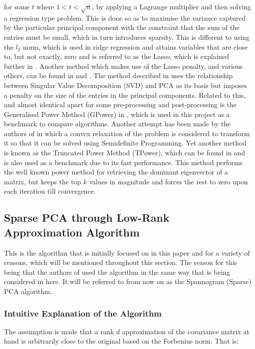 \documentclass[11pt,a4paper]{article}
\begin{document}
for some $t$ where $1<t<\sqrt{n}$, by applying a Lagrange multiplier and then solving a regression type problem. This is done so as to maximise the variance captured by the particular principal component with the constraint that the sum of the entries must be small, which in turn introduces sparsity. This is different to using the $l_2$ norm, which is used in ridge regression and attains variables that are close to, but not exactly, zero and is referred to as the Lasso, which is explained further in \cite{lasso}. Another method which makes use of the Lasso penalty, and various others, can be found in \cite{zou} and \cite{shen}. The method described in \cite{shen} uses the relationship between Singular Value Decomposition (SVD) and PCA as its basis but imposes a penalty on the size of the entries in the principal components. Related to this, and almost identical apart for some pre-processing and post-processing is the Generalised Power Method (GPower) in \cite{GPower}, which is used in this project as a benchmark to compare algorithms. Another attempt has been made by the authors of \cite{daspremont} in which a convex relaxation of the problem is considered to transform it so that it can be solved using Semidefinite Programming. Yet another method is known as the Truncated Power Method (TPower), which can be found in \cite{truncpower} and is also used as a benchmark due to its fast performance. This method performs the well known power method for retrieving the dominant eigenvector of a matrix, but keeps the top $k$ values in magnitude and forces the rest to zero upon each iteration till convergence. 


\subsection{Sparse PCA through Low-Rank Approximation Algorithm}
This is the algorithm\cite{dimakis} that is initially focused on in this paper and for a variety of reasons, which will be mentioned throughout this section. The reason for this being that the authors of\cite{dimakis} used the algorithm in the same way that is being considered in here. It will be referred to from now on as the Spannogram (Sparse) PCA  algorithm.

\subsubsection{Intuitive Explanation of the Algorithm}
The assumption is made that a rank $d$ approximation of the covariance matrix at hand is arbitrarily close to the original based on the Forbenius norm. That is:
\end{document}
